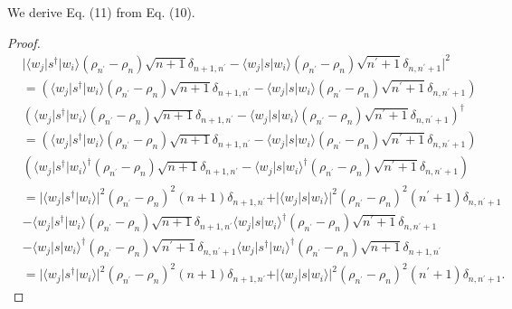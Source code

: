 \documentclass[../../note.tex]{subfiles}
\begin{document}
\begin{lemma}[Eq. (10) to Eq. (11)]
\label{lemma: 10 -> 11}
    We derive Eq. (11) from Eq. (10).
\end{lemma}
\begin{proof}
    \begin{align}
        &\vert \langle w_j \vert s^\dagger \vert w_i \rangle (\rho_{n^\prime} - \rho_n)\sqrt{n+1}\delta_{n+1, n^\prime}
        - \langle w_j \vert s \vert w_i \rangle (\rho_{n^\prime} - \rho_{n})\sqrt{n^\prime + 1}\delta_{n, n^\prime + 1} \vert^2 \\
        &= (\langle w_j \vert s^\dagger \vert w_i \rangle (\rho_{n^\prime} - \rho_n)\sqrt{n+1}\delta_{n+1, n^\prime}
        - \langle w_j \vert s \vert w_i \rangle (\rho_{n^\prime} - \rho_{n})\sqrt{n^\prime + 1}\delta_{n, n^\prime + 1}) \nonumber \\
        &(\langle w_j \vert s^\dagger \vert w_i \rangle (\rho_{n^\prime} - \rho_n)\sqrt{n+1}\delta_{n+1, n^\prime}
        - \langle w_j \vert s \vert w_i \rangle (\rho_{n^\prime} - \rho_{n})\sqrt{n^\prime + 1}\delta_{n, n^\prime + 1})^\dagger \\
        &= (\langle w_j \vert s^\dagger \vert w_i \rangle (\rho_{n^\prime} - \rho_n)\sqrt{n+1}\delta_{n+1, n^\prime}
        - \langle w_j \vert s \vert w_i \rangle (\rho_{n^\prime} - \rho_{n})\sqrt{n^\prime + 1}\delta_{n, n^\prime + 1}) \nonumber \\
        &(\langle w_j \vert s^\dagger \vert w_i \rangle^\dagger (\rho_{n^\prime} - \rho_n)\sqrt{n+1}\delta_{n+1, n^\prime}
        - \langle w_j \vert s \vert w_i \rangle^\dagger (\rho_{n^\prime} - \rho_{n})\sqrt{n^\prime + 1}\delta_{n, n^\prime + 1}) \\
        &= \vert \langle w_j \vert s^\dagger \vert w_i \rangle \vert^2(\rho_{n^\prime} - \rho_n)^2 (n+1) \delta_{n+1, n^\prime} + \vert \langle w_j \vert s \vert w_i \rangle \vert^2 (\rho_{n^\prime} - \rho_n)^2 (n^\prime + 1) \delta_{n, n^\prime + 1} \nonumber \\
        &- \langle w_j \vert s^\dagger \vert w_i \rangle (\rho_{n^\prime} - \rho_n)\sqrt{n+1}\delta_{n+1, n^\prime} \langle w_j \vert s \vert w_i \rangle^\dagger (\rho_{n^\prime} - \rho_{n})\sqrt{n^\prime + 1}\delta_{n, n^\prime + 1} \nonumber \\
        &- \langle w_j \vert s \vert w_i \rangle^\dagger (\rho_{n^\prime} - \rho_{n})\sqrt{n^\prime + 1}\delta_{n, n^\prime + 1} \langle w_j \vert s^\dagger \vert w_i \rangle^\dagger (\rho_{n^\prime} - \rho_n)\sqrt{n+1}\delta_{n+1, n^\prime} \\
        &= \vert \langle w_j \vert s^\dagger \vert w_i \rangle \vert^2(\rho_{n^\prime} - \rho_n)^2 (n+1) \delta_{n+1, n^\prime} + \vert \langle w_j \vert s \vert w_i \rangle \vert^2 (\rho_{n^\prime} - \rho_n)^2 (n^\prime + 1) \delta_{n, n^\prime + 1}.
    \end{align}
\end{proof}
\end{document}
